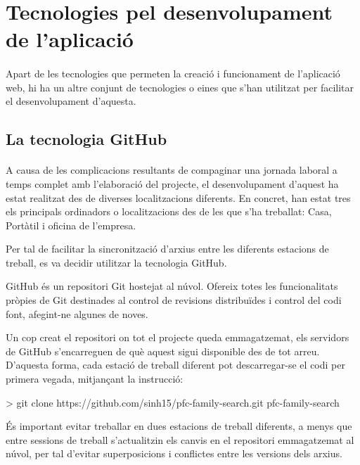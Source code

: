 \section{Tecnologies pel desenvolupament de l'aplicació}

    \paragraph{}
    Apart de les tecnologies que permeten la creació i funcionament de l'aplicació web, hi ha un altre conjunt de tecnologies o eines que s'han utilitzat per facilitar el desenvolupament d'aquesta.

    \subsection{La tecnologia GitHub}

    \paragraph{}
    A causa de les complicacions resultants de compaginar una jornada laboral a temps complet amb l'elaboració del projecte, el desenvolupament d’aquest ha estat re\-a\-lit\-zat des de diverses localitzacions diferents. En concret, han estat tres els principals ordinadors o localitzacions des de les que s’ha treballat: Casa, Portàtil i oficina de l'empresa.

    Per tal de facilitar la sincronització d'arxius entre les diferents estacions de treball, es va decidir utilitzar la tecnologia GitHub.

    GitHub és un repositori Git hostejat al núvol. Ofereix totes les funcionalitats pròpies de Git destinades al control de revisions distribuïdes i control del codi font, afegint-ne algunes de noves.

    Un cop creat el repositori on tot el projecte queda emmagatzemat, els servidors de GitHub s’encarreguen de què aquest sigui disponible des de tot arreu. D’aquesta forma, cada estació de treball diferent pot descarregar-se el codi per primera vegada, mitjançant la instrucció:

    \begin{displayquote}
        > git clone https://github.com/sinh15/pfc-family-search.git pfc-family-search
    \end{displayquote}

    És important evitar treballar en dues estacions de treball diferents, a menys que entre sessions de treball s’actualitzin els canvis en el repositori emmagatzemat al núvol, per tal d’evitar superposicions i conflictes entre les versions dels arxius.

